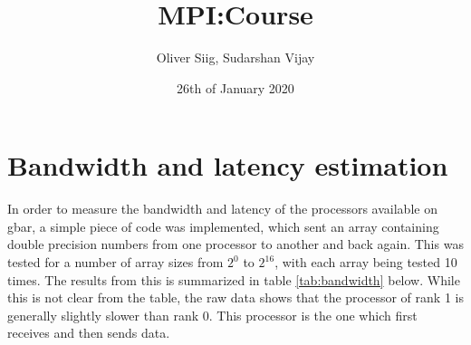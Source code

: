 \documentclass{article}
\title{MPI:Course}
\author{Oliver Siig, Sudarshan Vijay}
\date{26th of January 2020}
\begin{document}
\maketitle

\section{Bandwidth and latency estimation}

In order to measure the bandwidth and latency of the processors available on gbar, a simple piece of code was implemented, which sent an array containing double precision numbers from one processor to another and back again. This was tested for a number of array sizes from $2^{0}$ to $2^{16}$, with each array being tested 10 times. The results from this is summarized in table \ref{tab:bandwidth} below. While this is not clear from the table, the raw data shows that the processor of rank 1 is generally slightly slower than rank 0. This processor is the one which first receives and then sends data.\\
\end{document}

